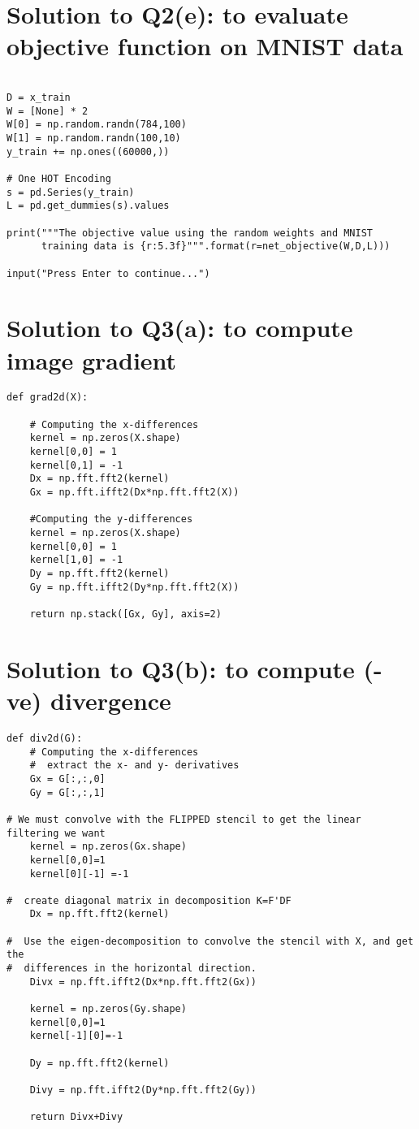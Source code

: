 \documentclass{article}
\begin{document}
\section*{Solution to Q2(e): to evaluate objective function on MNIST data}

\begin{verbatim}

D = x_train 
W = [None] * 2
W[0] = np.random.randn(784,100)
W[1] = np.random.randn(100,10)
y_train += np.ones((60000,))

# One HOT Encoding 
s = pd.Series(y_train)
L = pd.get_dummies(s).values

print("""The objective value using the random weights and MNIST 
      training data is {r:5.3f}""".format(r=net_objective(W,D,L)))

input("Press Enter to continue...")

\end{verbatim}

\section*{Solution to Q3(a): to compute image gradient}

\begin{verbatim}
def grad2d(X):
    
    # Computing the x-differences
    kernel = np.zeros(X.shape)
    kernel[0,0] = 1
    kernel[0,1] = -1
    Dx = np.fft.fft2(kernel)
    Gx = np.fft.ifft2(Dx*np.fft.fft2(X))
    
    #Computing the y-differences
    kernel = np.zeros(X.shape)
    kernel[0,0] = 1
    kernel[1,0] = -1
    Dy = np.fft.fft2(kernel)
    Gy = np.fft.ifft2(Dy*np.fft.fft2(X))
    
    return np.stack([Gx, Gy], axis=2)
\end{verbatim}

\section*{Solution to Q3(b): to compute (-ve) divergence}

\begin{verbatim}
def div2d(G):
    # Computing the x-differences
    #  extract the x- and y- derivatives
    Gx = G[:,:,0]
    Gy = G[:,:,1]
    
# We must convolve with the FLIPPED stencil to get the linear filtering we want 
    kernel = np.zeros(Gx.shape)
    kernel[0,0]=1
    kernel[0][-1] =-1
    
#  create diagonal matrix in decomposition K=F'DF
    Dx = np.fft.fft2(kernel)
    
#  Use the eigen-decomposition to convolve the stencil with X, and get the
#  differences in the horizontal direction.
    Divx = np.fft.ifft2(Dx*np.fft.fft2(Gx))
    
    kernel = np.zeros(Gy.shape)
    kernel[0,0]=1
    kernel[-1][0]=-1
    
    Dy = np.fft.fft2(kernel)

    Divy = np.fft.ifft2(Dy*np.fft.fft2(Gy))
        
    return Divx+Divy
\end{verbatim}
\end{document}
